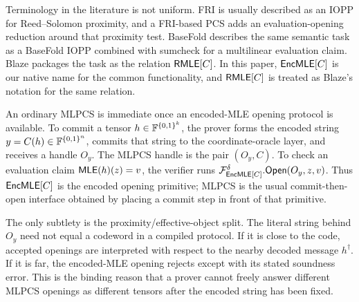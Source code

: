 Terminology in the literature is not uniform.  FRI is usually described as an
IOPP for Reed--Solomon proximity, and a FRI-based PCS adds an evaluation-opening
reduction around that proximity test.  BaseFold describes the same semantic
task as a BaseFold IOPP combined with sumcheck for a multilinear evaluation
claim.  Blaze packages the task as the relation \(\mathsf{RMLE}[C]\).  In this paper,
\(\mathsf{EncMLE}[C]\) is our native name for the common functionality, and
\(\mathsf{RMLE}[C]\) is treated as Blaze's notation for the same relation.

An ordinary MLPCS is immediate once an encoded-MLE opening protocol is
available.  To commit a tensor \(h\in\mathbb{F}^{\{0,1\}^k}\), the prover forms the encoded
string \(y=C(h)\in\mathbb{F}^{\{0,1\}^n}\), commits that string to the coordinate-oracle
layer, and receives a handle \(O_y\).  The MLPCS handle is the pair
\((O_y,C)\).  To check an evaluation claim \(\mathsf{MLE}(h)(z)=v\), the verifier runs
\(\mathcal F_{\mathsf{EncMLE}[C]}^\delta.\mathsf{Open}(O_y,z,v)\).  Thus
\(\mathsf{EncMLE}[C]\) is the encoded opening primitive; MLPCS is the usual
commit-then-open interface obtained by placing a commit step in front of that
primitive.

The only subtlety is the proximity/effective-object split.  The literal string
behind \(O_y\) need not equal a codeword in a compiled protocol.  If it is close
to the code, accepted openings are interpreted with respect to the nearby
decoded message \(h^\dagger\).  If it is far, the encoded-MLE opening rejects
except with its stated soundness error.  This is the binding reason that a
prover cannot freely answer different MLPCS openings as different tensors after
the encoded string has been fixed.

